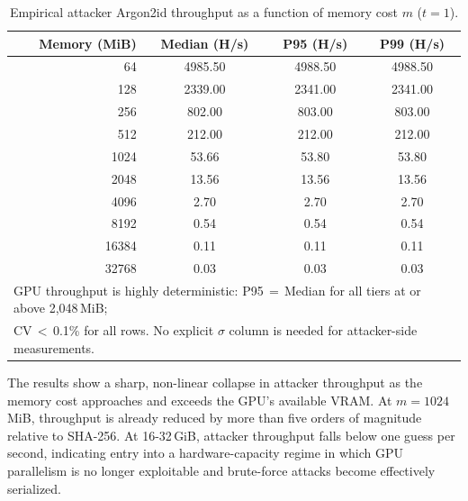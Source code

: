 \documentclass[journal,article,submit,pdftex,moreauthors]{Definitions/mdpi}
\begin{document}
\begin{table}[H]
\caption{Empirical attacker Argon2id throughput as a function of memory cost $m$ ($t=1$).}
\label{tab:argon2_spectrum}
\centering
\begin{tabular}{rccc}
\toprule
\textbf{Memory (MiB)} & \textbf{Median (H/s)} & \textbf{P95 (H/s)} & \textbf{P99 (H/s)} \\
\midrule
64    & 4985.50 & 4988.50 & 4988.50 \\
128   & 2339.00 & 2341.00 & 2341.00 \\
256   & 802.00  & 803.00  & 803.00  \\
512   & 212.00  & 212.00  & 212.00  \\
\midrule
1024  & 53.66   & 53.80   & 53.80   \\
2048  & 13.56   & 13.56   & 13.56   \\
4096  & 2.70    & 2.70    & 2.70    \\
8192  & 0.54    & 0.54    & 0.54    \\
\midrule
16384 & 0.11    & 0.11    & 0.11    \\
32768 & 0.03    & 0.03    & 0.03    \\
\bottomrule
\multicolumn{4}{l}{\footnotesize GPU throughput is highly deterministic: P95\,$=$\,Median for all tiers at or above 2{,}048\,MiB;}\\
\multicolumn{4}{l}{\footnotesize CV\,$<\,$0.1\% for all rows. No explicit $\sigma$ column is needed for attacker-side measurements.}
\end{tabular}
\end{table}

The results show a sharp, non-linear collapse in attacker throughput as the memory cost approaches and exceeds the GPU’s available VRAM. At $m = 1024$\,MiB, throughput is already reduced by more than five orders of magnitude relative to SHA-256. At 16-32\,GiB, attacker throughput falls below one guess per second, indicating entry into a hardware-capacity regime in which GPU parallelism is no longer exploitable and brute-force attacks become effectively serialized.
\end{document}

